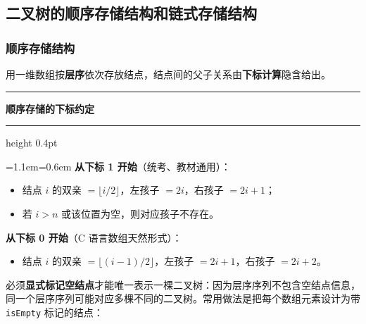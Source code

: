 \documentclass[11pt,openany,UTF8]{ctexbook}
\newcommand{\callouthead}[2]{%
  \par\addvspace{7pt}\noindent
  {\color{#1}\rule[-0.15em]{3pt}{1.05em}}\hspace{0.5em}%
  {\bfseries\color{#1}#2}\par\nobreak\vspace{-0.35em}%
  {\color{rulesep}\hrule height 0.4pt}\nobreak\vspace{0.45em}%
  \begingroup\small\setlength{\parindent}{0pt}%
  \leftskip=1.1em\rightskip=0.6em\noindent\ignorespaces}
\newcommand{\calloutend}{\par\endgroup\addvspace{7pt}}
\newenvironment{callkey}[1]{\callouthead{keybar}{#1}}{\calloutend}
\begin{document}
\subsection{二叉树的顺序存储结构和链式存储结构}

\subsubsection{顺序存储结构}

用一维数组按\textbf{层序}依次存放结点，结点间的父子关系由\textbf{下标计算}隐含给出。

\begin{callkey}{顺序存储的下标约定}
\textbf{从下标 1 开始}（统考、教材通用）：

\begin{itemize}
\item 结点 $i$ 的双亲 $=\lfloor i/2\rfloor$，左孩子 $=2i$，右孩子 $=2i+1$；
\item 若 $i>n$ 或该位置为空，则对应孩子不存在。
\end{itemize}
\textbf{从下标 0 开始}（C 语言数组天然形式）：

\begin{itemize}
\item 结点 $i$ 的双亲 $=\lfloor (i-1)/2\rfloor$，左孩子 $=2i+1$，右孩子 $=2i+2$。
\end{itemize}
\end{callkey}

必须\textbf{显式标记空结点}才能唯一表示一棵二叉树：因为层序序列不包含空结点信息，同一个层序序列可能对应多棵不同的二叉树。常用做法是把每个数组元素设计为带 \texttt{isEmpty} 标记的结点：
\end{document}
